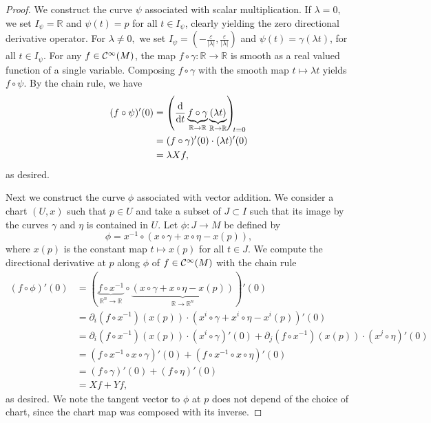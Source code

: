 \begin{proof}
    We construct the curve \(\psi\) associated with scalar multiplication. If \(\lambda = 0,\) we set \(I_\psi = \mathbb{R}\) and \(\psi(t) = p\) for all \(t \in I_\psi\), clearly yielding the zero directional derivative operator. For \(\lambda \neq 0,\) we set \(I_\psi = \left(-\frac{\varepsilon}{|\lambda|}, \frac{\varepsilon}{|\lambda|}\right)\) and \(\psi(t) = \gamma(\lambda t)\), for all \(t \in I_\psi\). For any \(f \in \mathcal{C}^\infty(M)\), the map \(f \circ \gamma : \mathbb{R} \to \mathbb{R}\) is smooth as a real valued function of a single variable. Composing \(f \circ \gamma\) with the smooth map \(t \mapsto \lambda t\) yields \(f \circ \psi\). By the chain rule, we have
    \begin{align*}
        (f \circ \psi)'(0) &= \diff*{\underbrace{f\circ \gamma}_{\mathbb{R} \to \mathbb{R}}\underbrace{(\lambda t)}_{\mathbb{R}\to \mathbb{R}}}{t}[t=0]\\
                           &= (f \circ \gamma)'(0) \cdot (\lambda t)'(0)\\
                           &= \lambda Xf,
    \end{align*}
    as desired.

    Next we construct the curve \(\phi\) associated with vector addition. We consider a chart \((U, x)\) such that \(p \in U\) and take a subset of \(J \subset I\) such that its image by the curves \(\gamma\) and \(\eta\) is contained in \(U\). Let \(\phi : J \to M\) be defined by
    \begin{equation*}
        \phi= x^{-1} \circ \left(x\circ \gamma+ x\circ \eta- x(p)\right),
    \end{equation*}
    where \(x(p)\) is the constant map \(t \mapsto x(p)\) for all \(t \in J\).
    We compute the directional derivative at \(p\) along \(\phi\) of \(f \in \mathcal{C}^\infty(M)\) with the chain rule
    \begin{align*}
        (f \circ \phi)'(0) &= \left(\underbrace{f \circ x^{-1}}_{\mathbb{R}^n \to \mathbb{R}} \circ \underbrace{\left(x\circ \gamma+ x\circ \eta- x(p)\right)}_{\mathbb{R} \to \mathbb{R}^n}\right)'(0)\\
                           &= \partial_i (f \circ x^{-1})(x(p)) \cdot \left(x^i \circ \gamma + x^i \circ \eta - x^i(p)\right)'(0)\\
                           &= \partial_i (f \circ x^{-1})(x(p)) \cdot (x^i \circ \gamma)'(0) + \partial_j (f \circ x^{-1})(x(p))\cdot (x^j \circ \eta)'(0)\\
                           &= \left(f \circ x^{-1} \circ x \circ \gamma\right)'(0) + \left(f \circ x^{-1} \circ x \circ \eta\right)'(0)\\
                           &= (f \circ \gamma)'(0) + (f \circ \eta)'(0)\\
                           &= Xf + Yf,
    \end{align*}
    as desired. We note the tangent vector to \(\phi\) at \(p\) does not depend of the choice of chart, since the chart map was composed with its inverse.
\end{proof}

